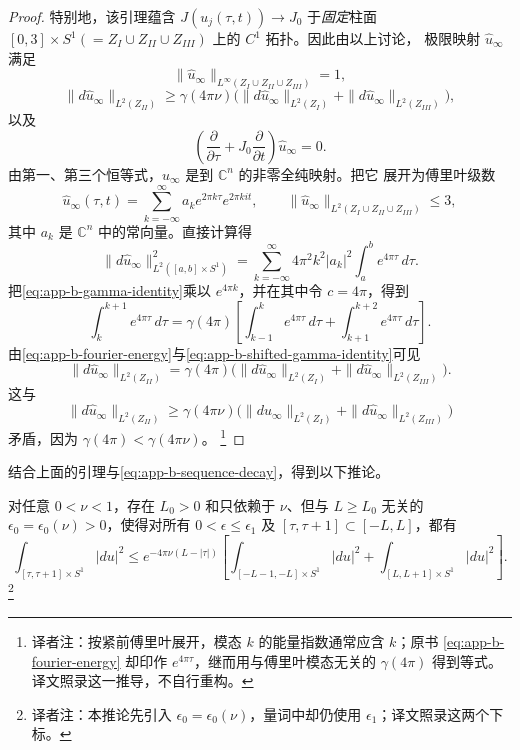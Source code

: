 \begin{proof}
特别地，该引理蕴含 $J(u_j(\tau,t))\to J_0$ 于\emph{固定}柱面
$[0,3]\times S^1(=Z_I\cup Z_{II}\cup Z_{III})$ 上的 $C^1$ 拓扑。因此由以上讨论，
极限映射 $\widehat u_\infty$ 满足
\[
 \|\widehat u_\infty\|_{L^\infty(Z_I\cup Z_{II}\cup Z_{III})}=1,
\]
\[
 \|d\widehat u_\infty\|_{L^2(Z_{II})}
 \geq\gamma(4\pi\nu)
 \bigl(\|d\widehat u_\infty\|_{L^2(Z_I)}
       +\|d\widehat u_\infty\|_{L^2(Z_{III})}\bigr),
\]
以及
\[
 \left(\frac\partial{\partial\tau}
 +J_0\frac\partial{\partial t}\right)\widehat u_\infty=0.
\]
由第一、第三个恒等式，$\widehat u_\infty$ 是到 $\mathbb C^n$ 的非零全纯映射。把它
展开为傅里叶级数
\[
 \widehat u_\infty(\tau,t)
 =\sum_{k=-\infty}^{\infty}a_ke^{2\pi k\tau}e^{2\pi kit},
 \qquad
 \|\widehat u_\infty\|_{L^2(Z_I\cup Z_{II}\cup Z_{III})}\leq3,
\]
其中 $a_k$ 是 $\mathbb C^n$ 中的常向量。直接计算得
\begin{equation}
\label{eq:app-b-fourier-energy}
 \|d\widehat u_\infty\|_{L^2([a,b]\times S^1)}^2
 =\sum_{k=-\infty}^{\infty}4\pi^2k^2|a_k|^2
   \int_a^be^{4\pi\tau}\,d\tau.
\end{equation}
把\eqref{eq:app-b-gamma-identity}乘以 $e^{4\pi k}$，并在其中令 $c=4\pi$，得到
\begin{equation}
\label{eq:app-b-shifted-gamma-identity}
 \int_k^{k+1}e^{4\pi\tau}\,d\tau
 =\gamma(4\pi)\left[
   \int_{k-1}^ke^{4\pi\tau}\,d\tau
   +\int_{k+1}^{k+2}e^{4\pi\tau}\,d\tau\right].
\end{equation}
由\eqref{eq:app-b-fourier-energy}与\eqref{eq:app-b-shifted-gamma-identity}可见
\[
 \|d\widehat u_\infty\|_{L^2(Z_{II})}
 =\gamma(4\pi)
 \bigl(\|d\widehat u_\infty\|_{L^2(Z_I)}
       +\|d\widehat u_\infty\|_{L^2(Z_{III})}\bigr).
\]
这与
\[
 \|d\widehat u_\infty\|_{L^2(Z_{II})}
 \geq\gamma(4\pi\nu)
 \bigl(\|d\widehat u_\infty\|_{L^2(Z_I)}
       +\|d\widehat u_\infty\|_{L^2(Z_{III})}\bigr)
\]
矛盾，因为 $\gamma(4\pi)<\gamma(4\pi\nu)$。
\footnote{译者注：按紧前傅里叶展开，模态 $k$ 的能量指数通常应含 $k$；原书
\eqref{eq:app-b-fourier-energy} 却印作 $e^{4\pi\tau}$，继而用与傅里叶模态无关的
$\gamma(4\pi)$ 得到等式。译文照录这一推导，不自行重构。}
\end{proof}

结合上面的引理与\eqref{eq:app-b-sequence-decay}，得到以下推论。

\begin{corollary}
\label{cor:app-b-energy-decay}
对任意 $0<\nu<1$，存在 $L_0>0$ 和只依赖于 $\nu$、但与 $L\geq L_0$ 无关的
$\epsilon_0=\epsilon_0(\nu)>0$，使得对所有 $0<\epsilon\leq\epsilon_1$ 及
$[\tau,\tau+1]\subset[-L,L]$，都有
\[
 \int_{[\tau,\tau+1]\times S^1}|du|^2
 \leq e^{-4\pi\nu(L-|\tau|)}
 \left[
  \int_{[-L-1,-L]\times S^1}|du|^2
  +\int_{[L,L+1]\times S^1}|du|^2
 \right].
\]
\footnote{译者注：本推论先引入 $\epsilon_0=\epsilon_0(\nu)$，量词中却仍使用
$\epsilon_1$；译文照录这两个下标。}
\end{corollary}

